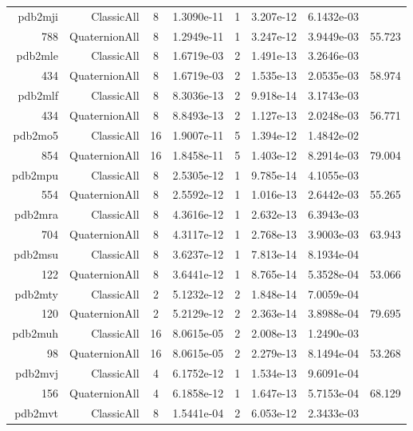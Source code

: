 \begin{xltabular}{\textwidth}{r|rcS[table-format=1.4e+2]cS[table-format=1.3e+2]S[table-format=1.4e+2]S[table-format=-1.3]}
pdb2mji & ClassicAll & 8 & 1.3090e-11 & 1 & 3.207e-12 & 6.1432e-03 & \\
788 & QuaternionAll & 8 & 1.2949e-11 & 1 & 3.247e-12 & 3.9449e-03 & 55.723\\  \addlinespace
pdb2mle & ClassicAll & 8 & 1.6719e-03 & 2 & 1.491e-13 & 3.2646e-03 & \\
434 & QuaternionAll & 8 & 1.6719e-03 & 2 & 1.535e-13 & 2.0535e-03 & 58.974\\  \addlinespace
pdb2mlf & ClassicAll & 8 & 8.3036e-13 & 2 & 9.918e-14 & 3.1743e-03 & \\
434 & QuaternionAll & 8 & 8.8493e-13 & 2 & 1.127e-13 & 2.0248e-03 & 56.771\\  \addlinespace
pdb2mo5 & ClassicAll & 16 & 1.9007e-11 & 5 & 1.394e-12 & 1.4842e-02 & \\
854 & QuaternionAll & 16 & 1.8458e-11 & 5 & 1.403e-12 & 8.2914e-03 & 79.004\\  \addlinespace
pdb2mpu & ClassicAll & 8 & 2.5305e-12 & 1 & 9.785e-14 & 4.1055e-03 & \\
554 & QuaternionAll & 8 & 2.5592e-12 & 1 & 1.016e-13 & 2.6442e-03 & 55.265\\  \addlinespace
pdb2mra & ClassicAll & 8 & 4.3616e-12 & 1 & 2.632e-13 & 6.3943e-03 & \\
704 & QuaternionAll & 8 & 4.3117e-12 & 1 & 2.768e-13 & 3.9003e-03 & 63.943\\  \addlinespace
pdb2msu & ClassicAll & 8 & 3.6237e-12 & 1 & 7.813e-14 & 8.1934e-04 & \\
122 & QuaternionAll & 8 & 3.6441e-12 & 1 & 8.765e-14 & 5.3528e-04 & 53.066\\  \addlinespace
pdb2mty & ClassicAll & 2 & 5.1232e-12 & 2 & 1.848e-14 & 7.0059e-04 & \\
120 & QuaternionAll & 2 & 5.2129e-12 & 2 & 2.363e-14 & 3.8988e-04 & 79.695\\  \addlinespace
pdb2muh & ClassicAll & 16 & 8.0615e-05 & 2 & 2.008e-13 & 1.2490e-03 & \\
98 & QuaternionAll & 16 & 8.0615e-05 & 2 & 2.279e-13 & 8.1494e-04 & 53.268\\  \addlinespace
pdb2mvj & ClassicAll & 4 & 6.1752e-12 & 1 & 1.534e-13 & 9.6091e-04 & \\
156 & QuaternionAll & 4 & 6.1858e-12 & 1 & 1.647e-13 & 5.7153e-04 & 68.129\\  \addlinespace
pdb2mvt & ClassicAll & 8 & 1.5441e-04 & 2 & 6.053e-12 & 2.3433e-03 & \\

\end{xltabular}
